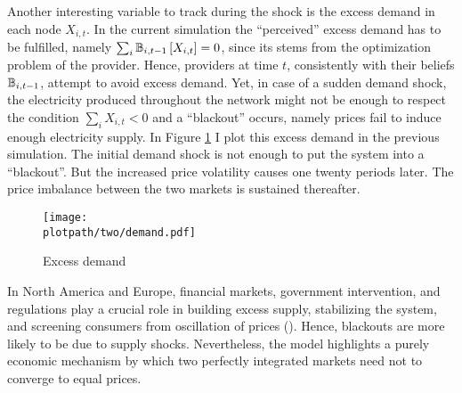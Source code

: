 Another interesting variable to track during the shock is the excess demand in each node $X_{i, t}$. In the current simulation the ``perceived'' excess demand has to be fulfilled, namely $\sum_i \mathbb{B}_{i, t-1}\left[X_{i, t}\right] = 0$, since its stems from the optimization problem of the provider. Hence, providers at time $t$, consistently with their beliefs $\mathbb{B}_{i, t-1}$, attempt to avoid excess demand. Yet, in case of a sudden demand shock, the electricity produced throughout the network might not be enough to respect the condition $\sum_i X_{i, t} < 0$ and a ``blackout'' occurs, namely prices fail to induce enough electricity supply.  In Figure \ref{fig:twodemand} I plot this excess demand in the previous simulation. The initial demand shock is not enough to put the system into a ``blackout''. But the increased price volatility causes one twenty periods later. The price imbalance between the two markets is sustained thereafter.

\begin{figure}[H]
  \centering
  \texttt{[image: \\plotpath/two/demand.pdf]}
  \caption{Excess demand} \label{fig:twodemand}
\end{figure}

In North America and Europe, financial markets, government intervention, and regulations play a crucial role in building excess supply, stabilizing the system, and screening consumers from oscillation of prices (\cite{Cicala2017, Mulder2019}). Hence, blackouts are more likely to be due to supply shocks. Nevertheless, the model highlights a purely economic mechanism by which two perfectly integrated markets need not to converge to equal prices. %